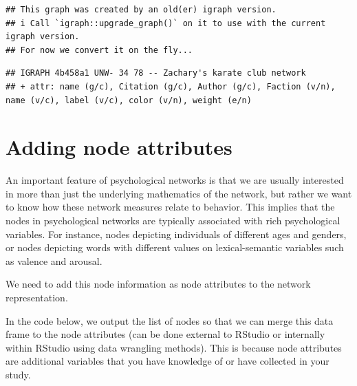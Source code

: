 \documentclass[
]{book}
\newenvironment{Shaded}{\begin{snugshade}}{\end{snugshade}}
\newcommand{\AttributeTok}[1]{\textcolor[rgb]{0.13,0.29,0.53}{#1}}
\newcommand{\CommentTok}[1]{\textcolor[rgb]{0.56,0.35,0.01}{\textit{#1}}}
\newcommand{\FunctionTok}[1]{\textcolor[rgb]{0.13,0.29,0.53}{\textbf{#1}}}
\newcommand{\NormalTok}[1]{#1}
\newcommand{\SpecialCharTok}[1]{\textcolor[rgb]{0.81,0.36,0.00}{\textbf{#1}}}
\newcommand{\StringTok}[1]{\textcolor[rgb]{0.31,0.60,0.02}{#1}}
\begin{document}
\begin{verbatim}
## This graph was created by an old(er) igraph version.
## i Call `igraph::upgrade_graph()` on it to use with the current igraph version.
## For now we convert it on the fly...
\end{verbatim}

\begin{verbatim}
## IGRAPH 4b458a1 UNW- 34 78 -- Zachary's karate club network
## + attr: name (g/c), Citation (g/c), Author (g/c), Faction (v/n), name (v/c), label (v/c), color (v/n), weight (e/n)
\end{verbatim}

\section{Adding node attributes}\label{adding-node-attributes}

An important feature of psychological networks is that we are usually interested in more than just the underlying mathematics of the network, but rather we want to know how these network measures relate to behavior. This implies that the nodes in psychological networks are typically associated with rich psychological variables. For instance, nodes depicting individuals of different ages and genders, or nodes depicting words with different values on lexical-semantic variables such as valence and arousal.

We need to add this node information as node attributes to the network representation.

In the code below, we output the list of nodes so that we can merge this data frame to the node attributes (can be done external to RStudio or internally within RStudio using data wrangling methods). This is because node attributes are additional variables that you have knowledge of or have collected in your study.

\begin{Shaded}
\end{Shaded}
\end{document}
